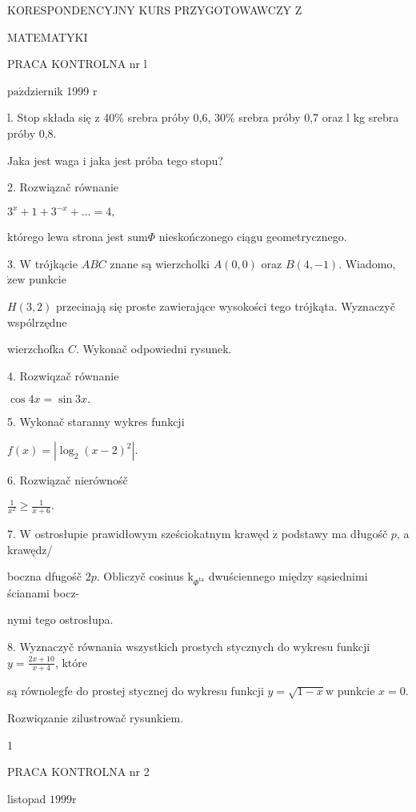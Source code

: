 \documentclass[a4paper,12pt]{article}
\begin{document}
KORESPONDENCYJNY KURS PRZYGOTOWAWCZY Z

MATEMATYKI

PRACA KONTROLNA nr l

$\mathrm{p}\mathrm{a}\acute{\mathrm{z}}$dziernik 1999 $\mathrm{r}$

l. Stop składa się $\mathrm{z}$ 40\% srebra próby 0,6, 30\% srebra próby 0,7 oraz l kg srebra próby 0,8.

Jaka jest waga $\mathrm{i}$ jaka jest próba tego stopu?

2. Rozwiązač równanie

$3^{x}+1+3^{-x}+\ldots=4,$

którego lewa strona jest $\mathrm{s}\mathrm{u}\mathrm{m}\Phi$ nieskończonego ciągu geometrycznego.

3. $\mathrm{W}$ trójkącie $ABC$ znane są wierzcholki $A(0,0)$ oraz $B(4,-1)$. Wiadomo, $\dot{\mathrm{z}}\mathrm{e}\mathrm{w}$ punkcie

$H(3,2)$ przecinają się proste zawierające wysokości tego trójkąta. Wyznaczyč wspólrzędne

wierzchofka $C$. Wykonač odpowiedni rysunek.

4. Rozwiqzač równanie

$\cos 4x=\sin 3x.$

5. Wykonač staranny wykres funkcji

$f(x)=|\log_{2}(x-2)^{2}|.$

6. Rozwiązač nierównośč

$\displaystyle \frac{1}{x^{2}}\geq\frac{1}{x+6}.$

7. $\mathrm{W}$ ostrosłupie prawidłowym sześciokatnym krawęd $\acute{\mathrm{z}}$ podstawy ma długośč $p$, a krawędz/

boczna dfugośč $2p$. Obliczyč cosinus $\mathrm{k}_{\Phi^{\mathrm{t}\mathrm{a}}}$ dwuściennego między sąsiednimi ścianami bocz-

nymi tego ostrosłupa.

8. Wyznaczyč równania wszystkich prostych stycznych do wykresu funkcji $y=\displaystyle \frac{2x+10}{x+4}$, które

są równolegfe do prostej stycznej do wykresu funkcji $y = \sqrt{1-x}\mathrm{w}$ punkcie $x = 0.$

Rozwiqzanie zilustrowač rysunkiem.

1




PRACA KONTROLNA nr 2

listopad $1999\mathrm{r}$
\end{document}
